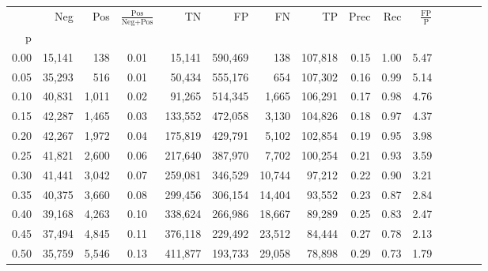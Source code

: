\begin{tabular}{rrrcrrrrrrrrrrr}
\toprule
{} &     Neg &    Pos & $\frac{\text{Pos}}{\text{Neg}+\text{Pos}}$ &       TN &       FP &       FN &       TP &  Prec &   Rec & $\frac{\text{FP}}{\text{P}}$ \\
p    &         &        &                                            &          &          &          &          &       &       &                              \\
\midrule
0.00 &  15,141 &    138 &                                       0.01 &   15,141 &  590,469 &      138 &  107,818 &  0.15 &  1.00 &                         5.47 \\
0.05 &  35,293 &    516 &                                       0.01 &   50,434 &  555,176 &      654 &  107,302 &  0.16 &  0.99 &                         5.14 \\
0.10 &  40,831 &  1,011 &                                       0.02 &   91,265 &  514,345 &    1,665 &  106,291 &  0.17 &  0.98 &                         4.76 \\
0.15 &  42,287 &  1,465 &                                       0.03 &  133,552 &  472,058 &    3,130 &  104,826 &  0.18 &  0.97 &                         4.37 \\
0.20 &  42,267 &  1,972 &                                       0.04 &  175,819 &  429,791 &    5,102 &  102,854 &  0.19 &  0.95 &                         3.98 \\
0.25 &  41,821 &  2,600 &                                       0.06 &  217,640 &  387,970 &    7,702 &  100,254 &  0.21 &  0.93 &                         3.59 \\
0.30 &  41,441 &  3,042 &                                       0.07 &  259,081 &  346,529 &   10,744 &   97,212 &  0.22 &  0.90 &                         3.21 \\
0.35 &  40,375 &  3,660 &                                       0.08 &  299,456 &  306,154 &   14,404 &   93,552 &  0.23 &  0.87 &                         2.84 \\
0.40 &  39,168 &  4,263 &                                       0.10 &  338,624 &  266,986 &   18,667 &   89,289 &  0.25 &  0.83 &                         2.47 \\
0.45 &  37,494 &  4,845 &                                       0.11 &  376,118 &  229,492 &   23,512 &   84,444 &  0.27 &  0.78 &                         2.13 \\
0.50 &  35,759 &  5,546 &                                       0.13 &  411,877 &  193,733 &   29,058 &   78,898 &  0.29 &  0.73 &                         1.79 \\

\end{tabular}
